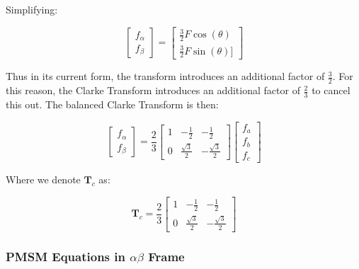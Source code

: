 \documentclass{article}
\begin{document}
Simplifying:

\begin{equation}
    \begin{bmatrix}
        f_\alpha \\[1pt]
        f_\beta
    \end{bmatrix}
    =
    \begin{bmatrix}
        \frac{3}{2}F\cos(\theta) \\[1pt]
        \frac{3}{2}F\sin(\theta)]
    \end{bmatrix}
\end{equation}

Thus in its current form, the transform introduces an additional factor of $\frac{3}{2}$. For this reason, the Clarke Transform introduces an additional factor of $\frac{2}{3}$ to cancel this out. The balanced Clarke Transform is then:

\begin{equation}
\label{clarke-transform}
    \begin{bmatrix}
        f_\alpha \\
        f_\beta
    \end{bmatrix}
    = \frac{2}{3}
    \begin{bmatrix}
        1 & -\frac{1}{2} & -\frac{1}{2} \\
        0 & \frac{\sqrt{3}}{2} & -\frac{\sqrt{3}}{2}
    \end{bmatrix}
    \begin{bmatrix}
        f_a \\
        f_b \\
        f_c
    \end{bmatrix}
\end{equation}

Where we denote $\mathbf{T}_c$ as:

\begin{equation}
\label{clarke-transform-matrix}
    \mathbf{T}_c =
    \frac{2}{3}
    \begin{bmatrix}
        1 & -\frac{1}{2} & -\frac{1}{2} \\
        0 & \frac{\sqrt{3}}{2} & -\frac{\sqrt{3}}{2}
    \end{bmatrix}
\end{equation}


\subsubsection{PMSM Equations in \texorpdfstring{$\alpha\beta$}{Alpha-Beta} Frame}
\end{document}
